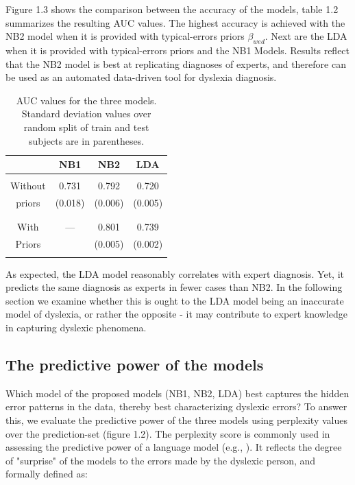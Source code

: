 {{{ \vspace*{2\baselineskip}

Figure 1.3 shows the comparison between the accuracy of the models, table 1.2 summarizes the resulting AUC values. The highest accuracy is achieved with the NB2 model when it is provided with typical-errors priors $\beta_{wed}$. Next are the LDA when it is provided with typical-errors priors and the NB1 Models. Results reflect that the NB2 model is best at replicating diagnoses of experts, and therefore can be used as an automated data-driven tool for dyslexia diagnosis.

\begin{table}
\centering
\begin{tabular}{|c|c|c|c|} \hline
& NB1 & NB2 & LDA \\
\hline
&&&\\
Without & 0.731 & 0.792 & 0.720 \\
priors & (0.018) & (0.006) & (0.005) \\
&&&\\
\hline
&&&\\
With & --- & 0.801 & 0.739 \\
Priors &  & (0.005) & (0.002) \\
&&&\\
\hline\end{tabular}
\bigskip
\caption{AUC values for the three models. Standard deviation values over random split of train and test subjects are in parentheses.} 
\end{table}

As expected, the LDA model reasonably correlates with expert diagnosis. Yet, it predicts the same diagnosis as experts in fewer cases than NB2. In the following section we examine whether this is ought to the LDA model being an inaccurate model of dyslexia, or rather the opposite - it may contribute to expert knowledge in capturing dyslexic phenomena.

\subsection{The predictive power of the models}
Which model of the proposed models (NB1, NB2, LDA) best captures the hidden error patterns in the data, thereby best characterizing dyslexic errors? To answer this, we evaluate the predictive power of the three models using perplexity values over the prediction-set (figure 1.2).
The perplexity score is commonly used in assessing the predictive power of a language model (e.g., \citealp{bnj03}). It reflects the degree of "surprise" of the models to the errors made by the dyslexic person, and formally defined as: 

}}}
